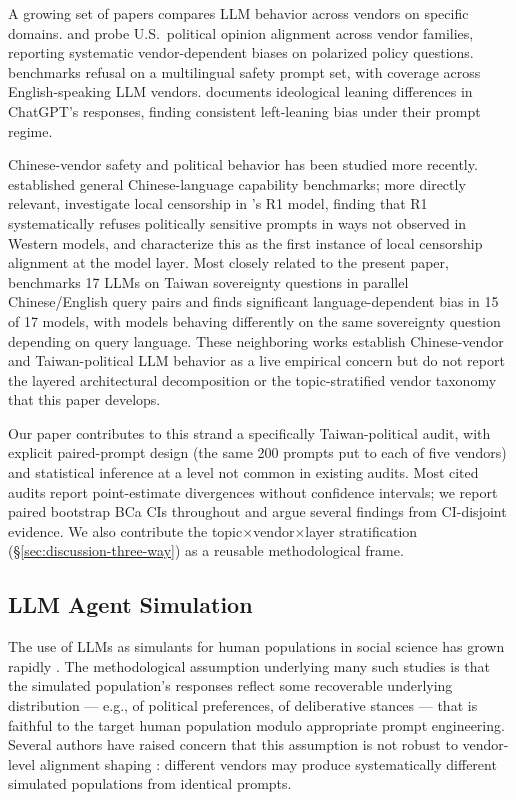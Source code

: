A growing set of papers compares LLM behavior across vendors on
specific domains. \citet{santurkar2023whose} and \citet{durmus2024opinionqa}
probe U.S.\ political opinion alignment across vendor families,
reporting systematic vendor-dependent biases on polarized policy
questions. \citet{rottger2024safetyprompts} benchmarks refusal on a
multilingual safety prompt set, with coverage across English-speaking
LLM vendors. \citet{hartmann2023political} documents ideological
leaning differences in ChatGPT's responses, finding consistent
left-leaning bias under their prompt regime.

Chinese-vendor safety and political behavior has been studied more
recently. \citet{huang2023ceval} established general Chinese-language
capability benchmarks; more directly relevant,
\citet{naseh2025r1dacted} investigate local censorship in
's R1 model, finding that R1 systematically refuses
politically sensitive prompts in ways not observed in Western models,
and characterize this as the first instance of local censorship
alignment at the model layer. Most closely related to the present paper,
\citet{ko2026bilingual} benchmarks 17 LLMs on Taiwan sovereignty
questions in parallel Chinese/English query pairs and finds significant
language-dependent bias in 15 of 17 models, with models behaving
differently on the same sovereignty question depending on query language.
These neighboring works establish Chinese-vendor and Taiwan-political
LLM behavior as a live empirical concern but do not report the layered
architectural decomposition or the topic-stratified vendor taxonomy that
this paper develops.

Our paper contributes to this strand a specifically Taiwan-political
audit, with explicit paired-prompt design (the same 200 prompts put
to each of five vendors) and statistical inference at a level not
common in existing audits. Most cited audits report point-estimate
divergences without confidence intervals; we report paired bootstrap
BCa CIs throughout and argue several findings from CI-disjoint evidence.
We also contribute the topic$\times$vendor$\times$layer stratification
(§\ref{sec:discussion-three-way}) as a reusable methodological frame.

\subsection{LLM Agent Simulation}\label{sec:related-simulation}

The use of LLMs as simulants for human populations in social science
has grown rapidly \citep{park2023generative,horton2023llm,
argyle2023samples,tornberg2023simulating}. The methodological
assumption underlying many such studies is that the simulated population's
responses reflect some recoverable underlying distribution --- e.g., of
political preferences, of deliberative stances --- that is faithful to
the target human population modulo appropriate prompt engineering.
Several authors have raised concern that this assumption is not robust
to vendor-level alignment shaping \citep{santurkar2023whose,
sun2024personasteered}: different vendors may produce systematically different
simulated populations from identical prompts.

